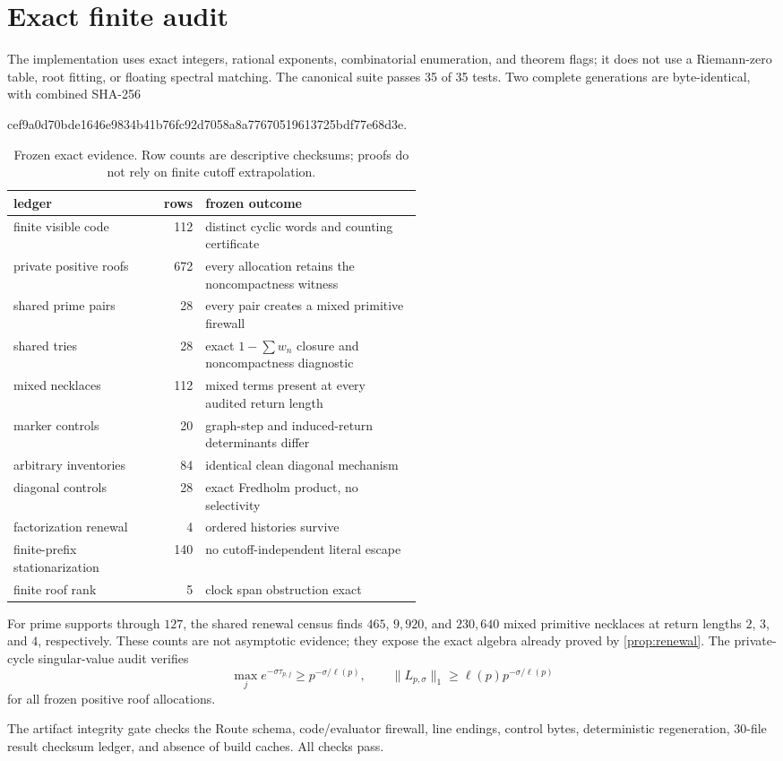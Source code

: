 \section{Exact finite audit}

The implementation uses exact integers, rational exponents, combinatorial
enumeration, and theorem flags; it does not use a Riemann-zero table,
root fitting, or floating spectral matching.  The canonical suite passes
35 of 35 tests.  Two complete generations are byte-identical, with combined
SHA-256
\begin{center}
\small\ttfamily
cef9a0d70bde1646e9834b41b76fc92d7058a8a77670519613725bdf77e68d3e.
\end{center}

\begin{table}[t]
\centering
\small
\begin{tabular}{@{}lrp{0.53\linewidth}@{}}
\toprule
ledger & rows & frozen outcome\\
\midrule
finite visible code & 112 & distinct cyclic words and counting certificate\\
private positive roofs & 672 & every allocation retains the noncompactness witness\\
shared prime pairs & 28 & every pair creates a mixed primitive firewall\\
shared tries & 28 & exact $1-\sum w_n$ closure and noncompactness diagnostic\\
mixed necklaces & 112 & mixed terms present at every audited return length\\
marker controls & 20 & graph-step and induced-return determinants differ\\
arbitrary inventories & 84 & identical clean diagonal mechanism\\
diagonal controls & 28 & exact Fredholm product, no selectivity\\
factorization renewal & 4 & ordered histories survive\\
finite-prefix stationarization & 140 & no cutoff-independent literal escape\\
finite roof rank & 5 & clock span obstruction exact\\
\bottomrule
\end{tabular}
\caption{Frozen exact evidence.  Row counts are descriptive checksums; proofs
do not rely on finite cutoff extrapolation.}
\label{tab:audit}
\end{table}

For prime supports through $127$, the shared renewal census finds
$465$, $9{,}920$, and $230{,}640$ mixed primitive necklaces at return
lengths $2$, $3$, and $4$, respectively.  These counts are not asymptotic
evidence; they expose the exact algebra already proved by
\cref{prop:renewal}.  The private-cycle singular-value audit verifies
\[
 \max_j e^{-\sigma\tau_{p,j}}\ge p^{-\sigma/\ell(p)},
 \qquad
 \|L_{p,\sigma}\|_1\ge\ell(p)p^{-\sigma/\ell(p)}
\]
for all frozen positive roof allocations.

The artifact integrity gate checks the Route schema, code/evaluator
firewall, line endings, control bytes, deterministic regeneration, 30-file
result checksum ledger, and absence of build caches.  All checks pass.

